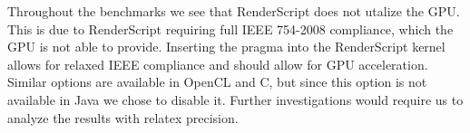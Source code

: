 Throughout the benchmarks we see that RenderScript
	does not utalize the GPU.
This is due to RenderScript requiring full
	IEEE 754-2008 compliance, which the GPU is not able to provide.
Inserting the  pragma into the
	RenderScript kernel allows for relaxed IEEE compliance and 
	should allow for GPU acceleration.
Similar options are available in OpenCL and C, but since
	this option is not available in Java we chose to disable it. 
Further investigations would require us to analyze the results with relatex precision.

